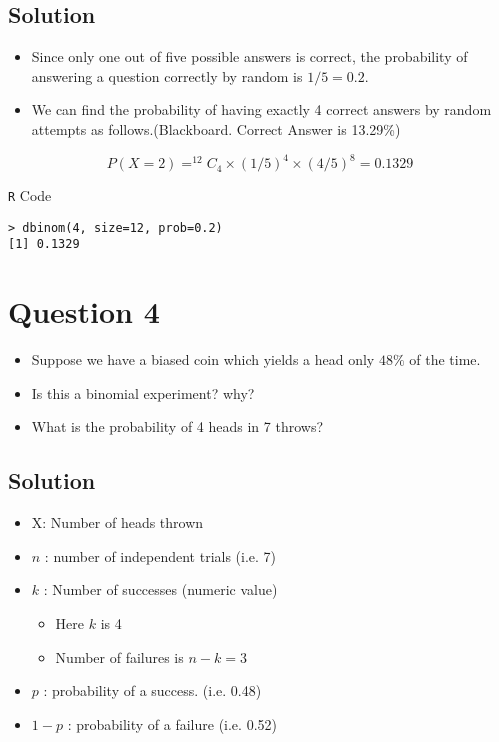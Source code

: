 \documentclass[a4paper,12pt]{article}
\begin{document}
\subsection*{Solution}
\begin{itemize}
\item Since only one out of five possible answers is correct, the probability of answering a question correctly by random is $1/5=0.2$. 
\item We can find the probability of having exactly 4 correct answers by random attempts as follows.(Blackboard. Correct Answer is 13.29\%)
\end{itemize}



\[P(X=2) = ^{12}C_4 \times (1/5)^4 \times (4/5)^8 = 0.1329\]

\begin{framed}
\noindent \texttt{R} Code
\begin{verbatim}
> dbinom(4, size=12, prob=0.2)
[1] 0.1329
\end{verbatim}
\end{framed}

\section*{Question 4}
\begin{itemize}
	
	\item Suppose we have a biased coin which yields a head only $48\%$ of the time.
	\item Is this a binomial experiment?  why?
	\item What is the probability of 4 heads in 7 throws?
\end{itemize}

\subsection*{Solution}
	\begin{itemize}
		\item X: Number of heads thrown
		\item $n$ : number of independent trials (i.e. 7)
		\item $k$ : Number of successes (numeric value)
		\begin{itemize}
			\item Here $k$ is 4
			\item Number of failures is $n-k  =3$
		\end{itemize}
		\item $p$ : probability of a success. (i.e. 0.48)
		\item $1-p$ : probability of a failure (i.e. 0.52)
	\end{itemize}
	
\end{document}
